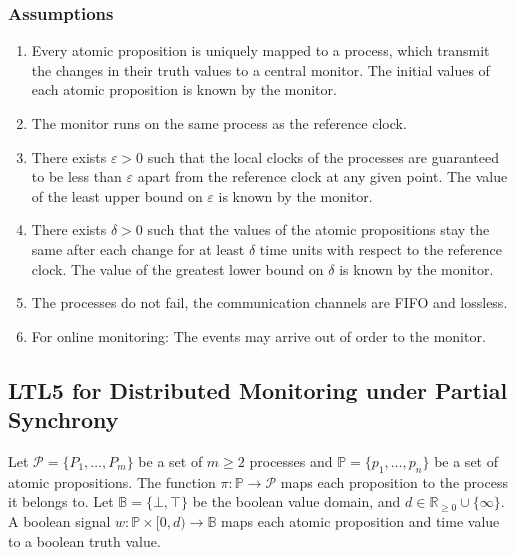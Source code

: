 \documentclass[envcountsame, runningheads]{llncs}
\title{}
\author{} %
\institute{} %
\date{}
\newcommand{\rednote}[2][]{{\todo[color=magenta!80,size=\footnotesize,#1]{\normalcolor\normalfont#2}}}
\newcommand{\R}{\mathbb{R}}
\newcommand{\B}{\mathbb{B}}
\newcommand{\?}{\text{?}}
\begin{document}
	\maketitle

	\subsubsection*{Assumptions}
	\begin{enumerate}
		\item Every atomic proposition is uniquely mapped to a process, which transmit the changes in their truth values to a central monitor. The initial values of each atomic proposition is known by the monitor.
		\item The monitor runs on the same process as the reference clock.
		\item There exists $\varepsilon > 0$ such that the local clocks of the processes are guaranteed to be less than $\varepsilon$ apart from the reference clock at any given point. The value of the least upper bound on $\varepsilon$ is known by the monitor. %
		\item There exists $\delta > 0$ such that the values of the atomic propositions stay the same after each change for at least $\delta$ time units with respect to the reference clock. The value of the greatest lower bound on $\delta$ is known by the monitor.
		\item The processes do not fail, the communication channels are FIFO and lossless.
		\item For online monitoring: The events may arrive out of order to the monitor. \rednote{Not taken into account yet.}
	\end{enumerate}
	
	\subsection*{LTL5 for Distributed Monitoring under Partial Synchrony}
	Let $\mathcal{P} = \{P_1, \ldots, P_m\}$ be a set of $m \geq 2$ processes and $\mathbb{P} = \{p_1, \ldots, p_n\}$ be a set of atomic propositions.
	The function $\pi : \mathbb{P} \to \mathcal{P}$ maps each proposition to the process it belongs to.
	Let $\B = \{\bot, \top\}$ be the boolean value domain, and $d \in \R_{\geq 0} \cup \{\infty\}$.
	A boolean signal $w : \mathbb{P} \times [0,d) \to \B$ maps each atomic proposition and time value to a boolean truth value.
\end{document}
